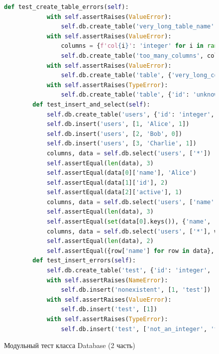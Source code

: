 \begin{figure}[H]
\begin{lstlisting}[language=Python, breaklines=true, firstnumber=42]		
		def test_create_table_errors(self):
			with self.assertRaises(ValueError):
				self.db.create_table('very_long_table_name', {'id': 'integer'})			
			with self.assertRaises(ValueError):
				columns = {f'col{i}': 'integer' for i in range(256)}
				self.db.create_table('too_many_columns', columns)			
			with self.assertRaises(ValueError):
				self.db.create_table('table', {'very_long_column_name': 'integer'})			
			with self.assertRaises(TypeError):
				self.db.create_table('table', {'id': 'unknown_type'})				
		def test_insert_and_select(self):
			self.db.create_table('users', {'id': 'integer', 'name': 'string', 'active': 'integer'})		
			self.db.insert('users', [1, 'Alice', 1])
			self.db.insert('users', [2, 'Bob', 0])
			self.db.insert('users', [3, 'Charlie', 1])			
			columns, data = self.db.select('users', ['*'])
			self.assertEqual(len(data), 3)
			self.assertEqual(data[0]['name'], 'Alice')
			self.assertEqual(data[1]['id'], 2)
			self.assertEqual(data[2]['active'], 1)			
			columns, data = self.db.select('users', ['name', 'active'])
			self.assertEqual(len(data), 3)
			self.assertEqual(set(data[0].keys()), {'name', 'active'})			
			columns, data = self.db.select('users', ['*'], where=lambda row: row['active'] == 1)
			self.assertEqual(len(data), 2)
			self.assertEqual({row['name'] for row in data}, {'Alice', 'Charlie'})			
		def test_insert_errors(self):
			self.db.create_table('test', {'id': 'integer', 'name': 'string'})			
			with self.assertRaises(NameError):
				self.db.insert('nonexistent', [1, 'test'])			
			with self.assertRaises(ValueError):
				self.db.insert('test', [1])			
			with self.assertRaises(TypeError):
				self.db.insert('test', ['not_an_integer', 'test'])
\end{lstlisting}  
\caption{Модульный тест класса Database (2 часть)}
\label{fig:test_db_2}
\end{figure}	
